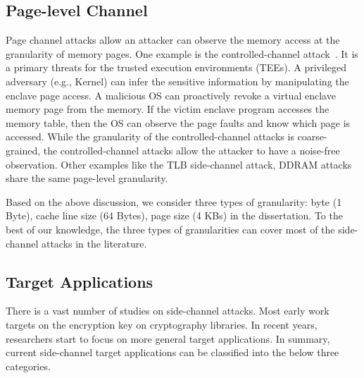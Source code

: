 \subsection{Page-level Channel}
Page channel attacks allow an attacker can observe the memory access at the granularity of memory pages. One example is the controlled-channel attack~\cite{xu2015controlled}. It is a primary threats for the trusted execution environments (TEEs).  A privileged adversary (e.g., Kernel) can infer the sensitive information by manipulating the enclave page access. A malicious OS can proactively revoke a virtual enclave memory page from the memory. If the victim enclave program accesses the memory table, then the OS can observe the page faults and  know which page is accessed. While the granularity of the controlled-channel attacks is coarse-grained, the controlled-channel attacks allow the attacker to have a noise-free observation. Other examples like the TLB side-channel attack, DDRAM attacks share the same page-level granularity.


Based on the above discussion, we consider three types of granularity: byte (1 Byte), cache line size (64 Bytes), page size (4 KBs) in the dissertation. To the best of our knowledge, the three types of granularities can cover most of the side-channel attacks in the literature.

\subsection{Target Applications}
There is a vast number of studies\cite{yarom2017cachebleed,191010,184415,Osvik2006,liu2015last} on side-channel attacks. Most early work targets on the encryption key on cryptography libraries. In recent years, researchers start to focus on more general target applications. In summary, current side-channel target applications can be classified into the below three categories.

